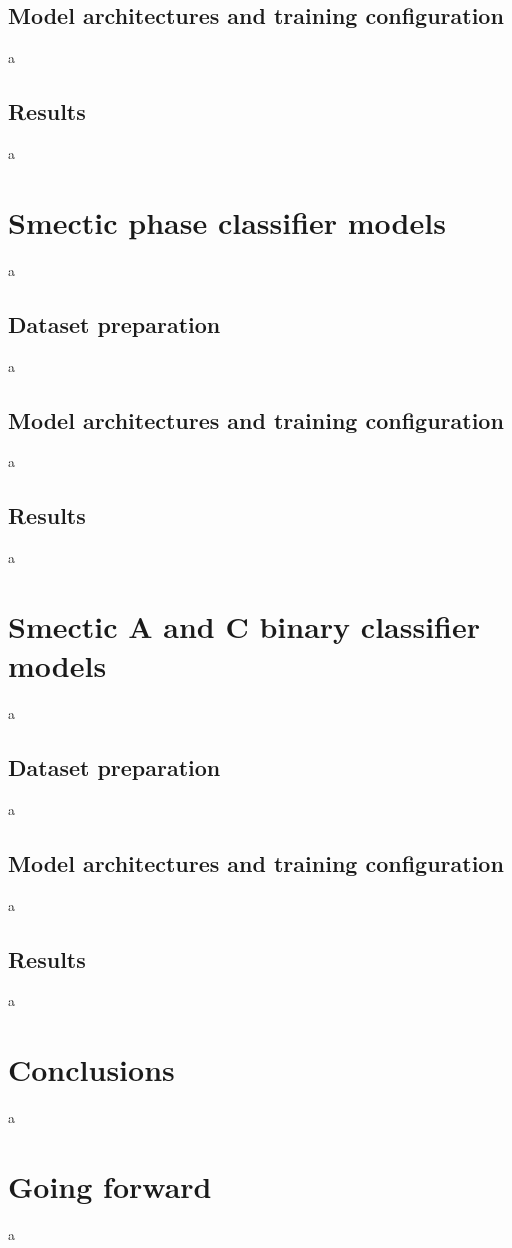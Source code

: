 \documentclass[12pt]{article}
\begin{document}
\subsection{Model architectures and training configuration}
a
\subsection{Results}
a
\section{Smectic phase classifier models}
a
\subsection{Dataset preparation}
a
\subsection{Model architectures and training configuration}
a
\subsection{Results}
a
\section{Smectic A and C binary classifier models}
a
\subsection{Dataset preparation}
a
\subsection{Model architectures and training configuration}
a
\subsection{Results}
a
\section{Conclusions}
a
\section{Going forward}
a


\end{document}
